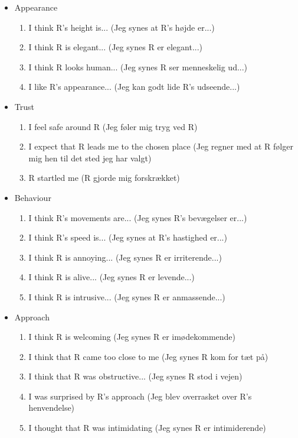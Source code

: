 \begin{itemize}
\item Appearance
\begin{enumerate}
  \item I think R's height is... (Jeg synes at R's højde er...)
  \item I think R is elegant... (Jeg synes R er elegant...)
  \item I think R looks human... (Jeg synes R ser menneskelig ud...)
  \item I like R's appearance... (Jeg kan godt lide R's udseende...)\\
\end{enumerate}
\item Trust 
\begin{enumerate}
  \item I feel safe around R (Jeg føler mig tryg ved R)
  \item I expect that R leads me to the chosen place (Jeg regner med at R følger mig hen til det sted jeg har valgt)
  \item R startled me (R gjorde mig forskrækket)\\
\end{enumerate}
\item Behaviour
\begin{enumerate}
  \item I think R's movements are... (Jeg synes R's bevægelser er...)
  \item I think R's speed is... (Jeg synes at R's hastighed er...)
  \item I think R is annoying... (Jeg synes R er irriterende...)
  \item I think R is alive... (Jeg synes R er levende...)
  \item I think R is intrusive... (Jeg synes R er anmassende...)\\
\end{enumerate}
\item Approach 
\begin{enumerate}
  \item I think R is welcoming (Jeg synes R er imødekommende)
  \item I think that R came too close to me (Jeg synes R kom for tæt på)
  \item I think that R was obstructive... (Jeg synes R stod i vejen)
  \item I was surprised by R's approach (Jeg blev overrasket over R's henvendelse)
  \item I thought that R was intimidating (Jeg synes R er intimiderende)\\
\end{enumerate}
\end{itemize}
